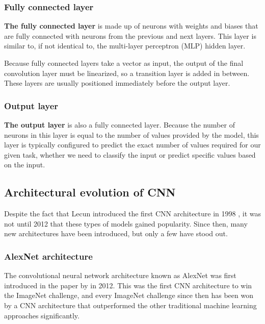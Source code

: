 \documentclass{report}[12pt, a4paper]
\begin{document}
\subsubsection{Fully connected layer}

\textbf{The fully connected layer} is made up of neurons with weights and biases that are fully connected with neurons from the previous and next layers. This layer is similar to, if not identical to, the multi-layer perceptron (MLP) hidden layer.

Because fully connected layers take a vector as input, the output of the final convolution layer must be linearized, so a transition layer is added in between. These layers are usually positioned immediately before the output layer.

\subsubsection{Output layer}

\textbf{The output layer} is also a fully connected layer. Because the number of neurons in this layer is equal to the number of values provided by the model, this layer is typically configured to predict the exact number of values required for our given task, whether we need to classify the input or predict specific values based on the input.

\subsection{Architectural evolution of CNN}

Despite the fact that Lecun introduced the first CNN architecture in 1998 \cite{lenet_paper}, it was not until 2012 that these types of models gained popularity. Since then, many new architectures have been introduced, but only a few have stood out.

\subsubsection{AlexNet architecture}

The convolutional neural network architecture known as AlexNet was first introduced in the paper  \cite{alexnet_paper} by \citeauthor{alexnet_paper} in 2012. This was the first CNN architecture to win the ImageNet\cite{imagenet_paper} challenge, and every ImageNet challenge since then has been won by a CNN architecture that outperformed the other traditional machine learning approaches significantly.
\end{document}
